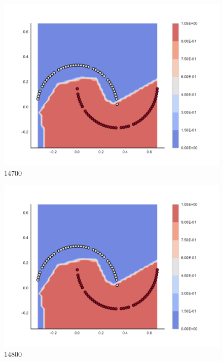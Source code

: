\begin{subfigure}[b]{0.09\textwidth}
    \includegraphics[clip, trim=2.35cm 1.75cm 4.5cm 0cm,width=\textwidth]{img/convergence/14700.pdf}
    \caption{14700}
    \label{fig:convergence_14700}
\end{subfigure}
%
\begin{subfigure}[b]{0.09\textwidth}
    \includegraphics[clip, trim=2.35cm 1.75cm 4.5cm 0cm,width=\textwidth]{img/convergence/14800.pdf}
    \caption{14800}
    \label{fig:convergence_14800}
\end{subfigure}
%
